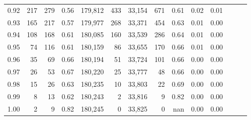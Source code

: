 \begin{tabular}{rrrrrrrrrrrrrr}
0.92 &    217 &  279 &  0.56 &  179,812 &      433 &  33,154 &     671 &  0.61 &  0.02 &      0.01 \\
0.93 &    165 &  217 &  0.57 &  179,977 &      268 &  33,371 &     454 &  0.63 &  0.01 &      0.00 \\
0.94 &    108 &  168 &  0.61 &  180,085 &      160 &  33,539 &     286 &  0.64 &  0.01 &      0.00 \\
0.95 &     74 &  116 &  0.61 &  180,159 &       86 &  33,655 &     170 &  0.66 &  0.01 &      0.00 \\
0.96 &     35 &   69 &  0.66 &  180,194 &       51 &  33,724 &     101 &  0.66 &  0.00 &      0.00 \\
0.97 &     26 &   53 &  0.67 &  180,220 &       25 &  33,777 &      48 &  0.66 &  0.00 &      0.00 \\
0.98 &     15 &   26 &  0.63 &  180,235 &       10 &  33,803 &      22 &  0.69 &  0.00 &      0.00 \\
0.99 &      8 &   13 &  0.62 &  180,243 &        2 &  33,816 &       9 &  0.82 &  0.00 &      0.00 \\
1.00 &      2 &    9 &  0.82 &  180,245 &        0 &  33,825 &       0 &   nan &  0.00 &      0.00 \\
\bottomrule
\end{tabular}
